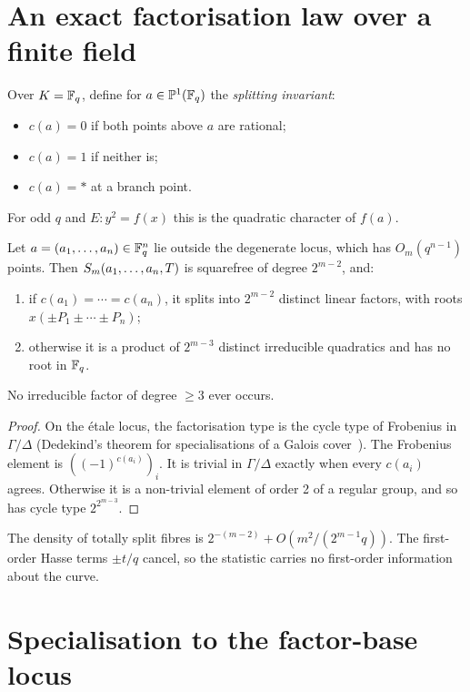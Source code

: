 \section{An exact factorisation law over a finite field}

Over $K=\mathbb{F}_q$, define for $a\in\mathbb{P}^1(\mathbb{F}_q)$ the \emph{splitting
invariant}:
\begin{itemize}
\item $c(a)=0$ if both points above $a$ are rational;
\item $c(a)=1$ if neither is;
\item $c(a)=\ast$ at a branch point.
\end{itemize}
For odd $q$ and $E:y^2=f(x)$ this is the quadratic character of $f(a)$.

\begin{theorem}\label{thm:factor}
Let $a=(a_1,\ldots,a_n)\in\mathbb{F}_q^n$ lie outside the degenerate locus, which
has $O_m(q^{n-1})$ points. Then $S_{m}(a_1,\ldots,a_n,T)$ is squarefree of
degree $2^{m-2}$, and:
\begin{enumerate}
\item if $c(a_1)=\cdots=c(a_n)$, it splits into $2^{m-2}$ distinct
  linear factors, with roots $x(\pm P_1\pm\cdots\pm P_n)$;
\item otherwise it is a product of $2^{m-3}$ distinct irreducible
  quadratics and has no root in $\mathbb{F}_q$.
\end{enumerate}
No irreducible factor of degree $\ge3$ ever occurs.
\end{theorem}

\begin{proof}
On the étale locus, the factorisation type is the cycle type of
Frobenius in $\Gamma/\Delta$ (Dedekind's theorem for specialisations of a
Galois cover~\cite{friedjarden2008}). The Frobenius element is
$((-1)^{c(a_i)})_i$. It is trivial in $\Gamma/\Delta$ exactly when every
$c(a_i)$ agrees. Otherwise it is a non-trivial element of order 2 of a
regular group, and so has cycle type $2^{2^{m-3}}$.
\end{proof}

The density of totally split fibres is $2^{-(m-2)}+O(m^2/(2^{m-1}q))$. The
first-order Hasse terms $\pm t/q$ cancel, so the statistic carries no
first-order information about the curve.

\section{Specialisation to the factor-base locus}

